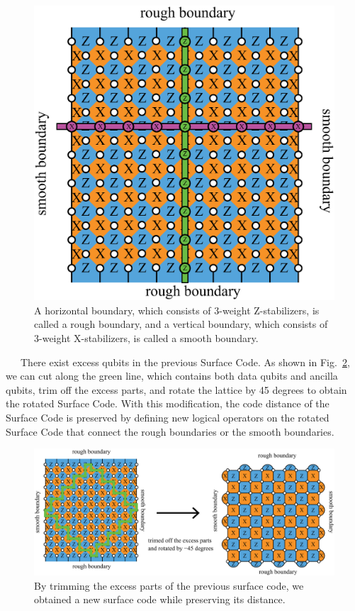 \documentclass[a4paper,11pt]{ltjsarticle}
\begin{document}
{{        \begin{figure}[h]
            \centering
            \includegraphics[scale=0.30]{figure/logical_operator_planar.eps}
            \vspace{0pt}\caption{A horizontal boundary, which consists of 3-weight Z-stabilizers, is called a rough boundary, and a vertical boundary, which consists of 3-weight X-stabilizers, is called a smooth boundary.}
            \label{logical_operator_planar}
        \end{figure}

        \ \ \ There exist excess qubits in the previous Surface Code. As shown in Fig.~\ref{rotated_surface_code}, we can cut along the green line, which contains both data qubits and ancilla qubits, trim off the excess parts, and rotate the lattice by 45 degrees to obtain the rotated Surface Code. With this modification, the code distance of the Surface Code is preserved by defining new logical operators on the rotated Surface Code that connect the rough boundaries or the smooth boundaries.


        \begin{figure}[h]
            \centering
            \includegraphics[scale=0.25]{figure/rotated_surface_code.eps}
            \caption{By trimming the excess parts of the previous surface code, we obtained a new surface code while preserving its distance.}
            \label{rotated_surface_code}
        \end{figure}

        
    }
}
\end{document}
